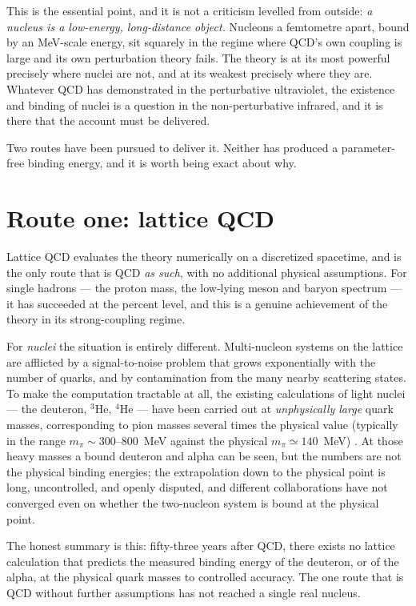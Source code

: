 \documentclass[11pt]{article}
\begin{document}
This is the essential point, and it is not a criticism levelled from outside: \emph{a nucleus is a
low-energy, long-distance object.} Nucleons a femtometre apart, bound by an MeV-scale energy, sit
squarely in the regime where QCD's own coupling is large and its own perturbation theory fails. The
theory is at its most powerful precisely where nuclei are not, and at its weakest precisely where they
are. Whatever QCD has demonstrated in the perturbative ultraviolet, the existence and binding of nuclei
is a question in the non-perturbative infrared, and it is there that the account must be delivered.

Two routes have been pursued to deliver it. Neither has produced a parameter-free binding energy, and it
is worth being exact about why.

\section{Route one: lattice QCD}
\label{sec:lattice}

Lattice QCD evaluates the theory numerically on a discretized spacetime, and is the only route that is
QCD \emph{as such}, with no additional physical assumptions. For single hadrons --- the proton mass, the
low-lying meson and baryon spectrum --- it has succeeded at the percent level, and this is a genuine
achievement of the theory in its strong-coupling regime.

For \emph{nuclei} the situation is entirely different. Multi-nucleon systems on the lattice are afflicted
by a signal-to-noise problem that grows exponentially with the number of quarks, and by contamination
from the many nearby scattering states. To make the computation tractable at all, the existing
calculations of light nuclei --- the deuteron, ${}^3$He, ${}^4$He --- have been carried out at
\emph{unphysically large} quark masses, corresponding to pion masses several times the physical value
(typically in the range $m_\pi \sim 300$--$800$~MeV against the physical $m_\pi \simeq 140$~MeV)
\cite{beane2013,yamazaki2012}. At those heavy masses a bound deuteron and alpha can be seen, but the
numbers are not the physical binding energies; the extrapolation down to the physical point is long,
uncontrolled, and openly disputed, and different collaborations have not converged even on whether the
two-nucleon system is bound at the physical point.

The honest summary is this: fifty-three years after QCD, there exists no lattice calculation that
predicts the measured binding energy of the deuteron, or of the alpha, at the physical quark masses to
controlled accuracy. The one route that is QCD without further assumptions has not reached a single real
nucleus.
\end{document}
